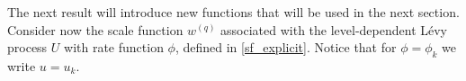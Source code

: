 \documentclass[12pt,reqno]{amsart}
\newcommand{\blue}{\textcolor[rgb]{0.00,0.00,1.00}}
\newtheorem{lemma}[theorem]{Lemma}
\theoremstyle{definition}
\theoremstyle{remark}
\newcommand{\p}{\mathbb{P}}
\begin{document}
The next result will introduce new functions that will be used in the next section. 
Consider now the  scale function $w^{(q)}$ associated with the level-dependent L\'evy process $U$ with rate function $\phi$, 
defined in \eqref{sf_explicit}. Notice that for $\phi=\phi_k$ we write $u=u_k$.
\end{document}
